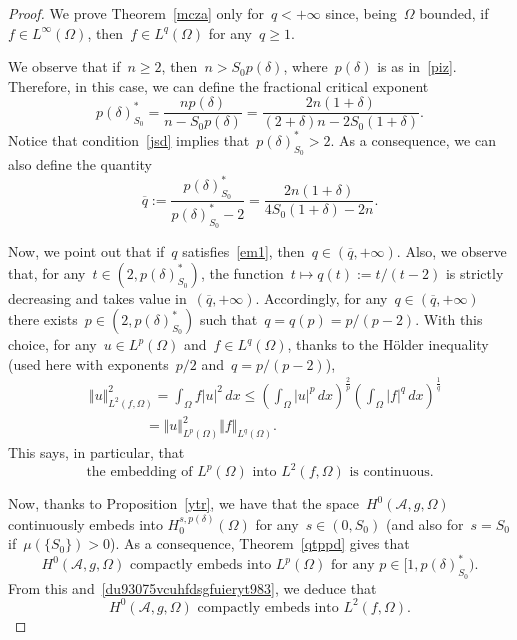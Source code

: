 \documentclass[11pt,hyp,]{nyjm}
\numberwithin{equation}{section}
\theoremstyle{remark}
\renewcommand{\le}{\leqslant}
\renewcommand{\geq}{\geqslant}
\renewcommand{\ge}{\geqslant}
\begin{document}
\begin{proof}
We prove Theorem~\ref{mcza} only for~$q<+\infty$ since, being~$\Omega$ bounded, if~$f \in L^{\infty}(\Omega)$, then~$f\in L^q(\Omega)$ for any~$q \geq 1$.

We observe that if~$n\ge2$, then~$n>S_0 p(\delta)$,
where~$p(\delta)$ is as in~\eqref{piz}. Therefore, in this case, we can define the fractional critical exponent
$$ {p(\delta)}_{S_0}^* = 
\frac{np(\delta)}{n-S_0p(\delta)}
=\frac{2n(1+\delta)}{(2+\delta)n - 2S_0(1+\delta)}.$$
Notice that condition~\eqref{jsd} implies that~${p(\delta)}^*_{S_0}> 2$. As a consequence,
we can also define the quantity
\begin{equation*}
\overline{q}:=\frac{{p(\delta)}_{S_0}^*}{{p(\delta)}_{S_0}^*-2}= \frac{2n(1+\delta)}{4S_0(1+\delta)-2n}.
\end{equation*}

{N}ow, we point out that if~$q$ satisfies~\eqref{em1}, then~$q\in (\overline{q}, +\infty)$.
Also, we observe that, for any~$t \in (2, {p(\delta)}^*_{S_0})$, the function~$t \mapsto q(t):=t/(t-2)$ is strictly decreasing and takes value in~$(\overline{q}, +\infty)$.
Accordingly, for any~$q\in(\overline{q}, +\infty)$
there exists~$p\in (2,{p(\delta)}^*_{S_0})$ such that~$q=q(p)=p/(p-2)$.
With this choice, for any~$u \in L^p(\Omega)$ and~$f \in L^q(\Omega)$, thanks to the H\"{o}lder inequality (used here
with exponents~$p/2$ and~$q=p/(p-2)$),
\begin{equation}\label{u943075v6bgfueigwufrvbnmfdgiuer}\begin{split}&
\Vert u \Vert^2_{L^2(f,\Omega)}=\int_{\Omega} f|u|^2\,dx\le \left(\int_{\Omega}|u|^p\,dx\right)^{\frac2p}
\left(\int_\Omega |f|^q\,dx\right)^{\frac{1}{q}}\\&\qquad\qquad=\Vert u \Vert^2_{L^p(\Omega)}\Vert f \Vert_{L^q(\Omega)}.\end{split}
\end{equation}
This says, in particular, that 
\begin{equation}\label{du93075vcuhfdsgfuieryt983}
{\mbox{the embedding of~$L^p(\Omega)$ into~$L^2(f, \Omega)$ is continuous.}}\end{equation}

Now, thanks to Proposition~\ref{ytr}, we have that the space~$H^0(\mathcal{A}, g, \Omega)$ continuously embeds into $H_0^{s, p(\delta)}(\Omega)$ for any~$s \in(0,S_0)$ (and also for~$s=S_0$ if~$\mu(\{S_0\})>0$). As a consequence, Theorem~\ref{qtppd} gives that
\begin{equation}\label{proppi}
{\mbox{$H^0(\mathcal{A}, g, \Omega)$ compactly embeds into~$L^{p}(\Omega)$ for any~$p\in [1,{p(\delta)}^*_{S_0})$.}}
\end{equation}
{F}rom this and~\eqref{du93075vcuhfdsgfuieryt983}, we deduce that
\begin{equation}\label{zega}
{\mbox{$H^0(\mathcal{A}, g, \Omega)$ compactly embeds into~$L^{2}(f,\Omega)$.}}
\end{equation}


\end{proof}
\end{document}
